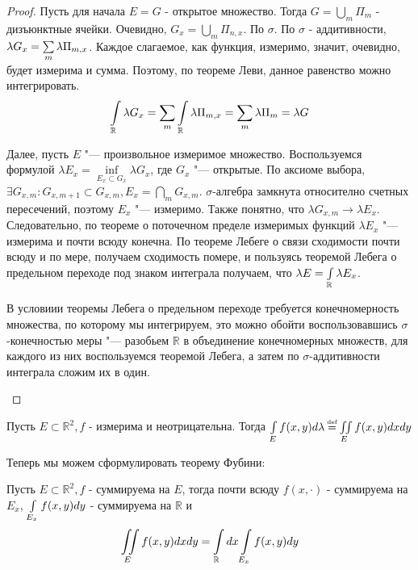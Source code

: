 \begin{proof}
    Пусть для начала $E = G$ - открытое множество. Тогда $G = \bigcup\limits_{m} \Pi_m$ - дизъюнктные ячейки. 
    Очевидно, $G_x = \bigcup\limits_{m} \Pi_{n, x}$. По $\sigma$. По $\sigma$ - аддитивности, $\lambda G_x = \sum\limits_{m}\lambda \Pi_{m, x}$.
    Каждое слагаемое, как функция, измеримо, значит, очевидно, будет измерима и сумма. 
    Поэтому, по теореме Леви, данное равенство можно интегрировать. 
    \begin{gather*}
        \int\limits_{\mathbb{R}} \lambda G_x = \sum\limits_{m} \int\limits_{\mathbb{R}} \lambda \Pi_{m ,x} = \sum\limits_{m} \lambda \Pi_m = \lambda G
    \end{gather*}

    Далее, пусть $E$ "--- произвольное измеримое множество. 
	 Воспользуемся формулой $\lambda E_x = \inf\limits_{E_x \subset G_x} \lambda G_x$, где $G_x$ "--- открытые. 
	 По аксиоме выбора, $\exists G_{x,m} : G_{x,m+1} \subset G_{x,m}, E_x = \bigcap\limits_{m} G_{x,m}$.
	 $\sigma$-алгебра замкнута относително счетных пересечений, поэтому $E_x$ "--- измеримо.  
	 Также понятно, что $\lambda G_{x,m} \rightarrow \lambda E_x$. Следовательно, по теореме о поточечном пределе измеримых функций $\lambda E_x$ "--- измерима
	 и почти всюду конечна. По теореме Лебеге о связи сходимости почти всюду и по мере, получаем сходимость помере, 
	 и пользуясь теоремой Лебега о предельном переходе под знаком интеграла получаем, что $\lambda E = \int\limits_{\mathbb{R}} \lambda E_x$.
	 \begin{nb}
		 В условиии теоремы Лебега о предельном переходе требуется конечномерность множества, по которому мы интегрируем, 
		 это можно обойти воспользовавшись $\sigma$-конечностью меры "--- разобьем $\mathbb{R}$ в объединение конечномерных множеств,
		 для каждого из них воспользуемся теоремой Лебега, а затем по $\sigma$-аддитивности интеграла сложим их в один.
	 \end{nb}
\end{proof}

\begin{definition}
    Пусть $E \subset \mathbb{R}^2, f$ - измерима и неотрицательна. Тогда
    $\intl{E} f(x, y) d\lambda \defeq \iintl{E} f(x, y) dxdy$
\end{definition}

Теперь мы можем сформулировать теорему Фубини:

\begin{theorem}
    Пусть $E \subset \mathbb{R}^2, f$ - суммируема на $E$, тогда почти всюду $f(x, \cdot)$ - 
    суммируема на $E_x$, $\int\limits_{E_x} f(x, y) dy$ -  суммируема на $\mathbb{R}$ и
    \begin{gather*}
        \iint\limits_{E} f(x, y) dxdy = \int\limits_{\mathbb{R}} dx \int\limits_{E_x} f(x, y) dy
    \end{gather*}
\end{theorem}

